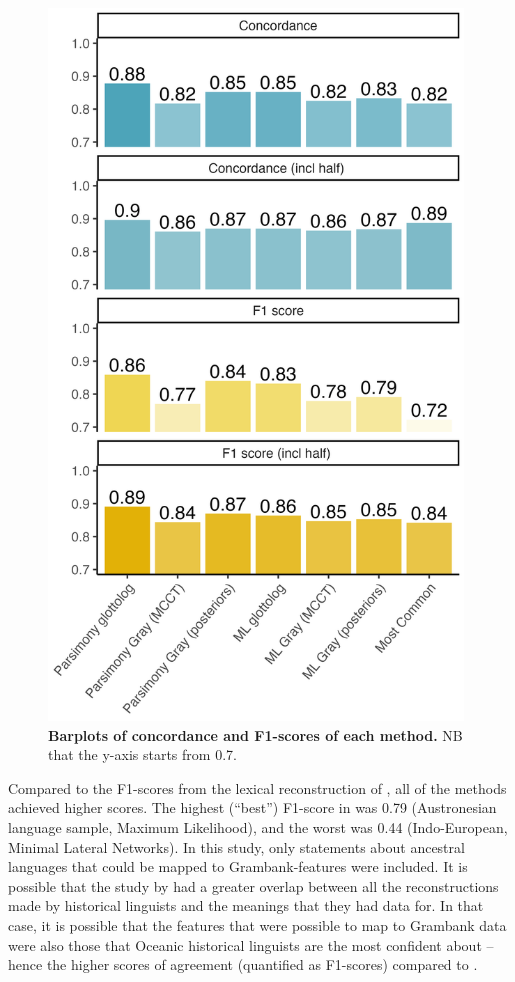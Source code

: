 \documentclass[12pt,letterpaper]{article}
\begin{document}
\begin{figure}[p]
\centering
\includegraphics[width=11cm]{illustrations/plots_from_R/results/barplot_facet_scores.png}
\caption{\textbf{Barplots of concordance and F1-scores of each method.} NB that the y-axis starts from 0.7.}
\label{barplot_facet_results_incl_f1}
\end{figure}

Compared to the F1-scores from the lexical reconstruction of \citet{jager2018using}, all of the methods achieved higher scores. The highest (``best'') F1-score in \citet{jager2018using} was 0.79 (Austronesian language sample, Maximum Likelihood), and the worst was 0.44 (Indo-European, Minimal Lateral Networks). In this study, only statements about ancestral languages that could be mapped to Grambank-features were included. It is  possible that the study by \citet{jager2018using} had a greater overlap between all the reconstructions made by historical linguists and the meanings that they had data for. In that case, it is possible that the features that were possible to map to Grambank data were also those that Oceanic historical linguists are the most confident about -- hence the higher scores of agreement (quantified as F1-scores) compared to \citet{jager2018using}.
\end{document}
